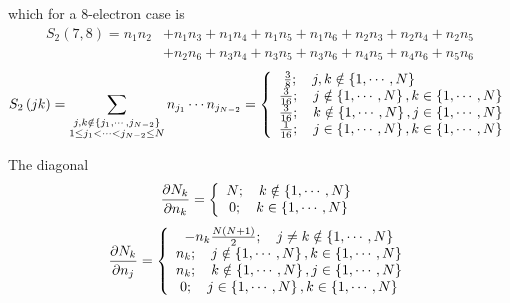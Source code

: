 \documentclass[aps,preprint]{revtex4}%
\begin{document}
which for a $8$-electron case is
\begin{align}
S_{2}\left(  7,8\right)  =n_{1}n_{2}  &  +n_{1}n_{3}+n_{1}n_{4}+n_{1}%
n_{5}+n_{1}n_{6}+n_{2}n_{3}+n_{2}n_{4}+n_{2}n_{5}\\
&  +n_{2}n_{6}+n_{3}n_{4}+n_{3}n_{5}+n_{3}n_{6}+n_{4}n_{5}+n_{4}n_{6}%
+n_{5}n_{6}%
\end{align}
\begin{equation}
S_{2}\left(  jk\right)  =\sum_{\substack{j,k\notin\left\{  j_{1}%
,\cdots,j_{N-2}\right\}  \\1\leq j_{1}<\cdots<j_{N-2}\leq N}}n_{j_{1}}\cdots
n_{j_{N-2}}=\left\{
\begin{array}
[c]{c}%
\frac{3}{8};\quad j,k\notin\left\{  1,\cdots,N\right\}  \qquad\qquad\qquad\\
\frac{3}{16};\quad j\notin\left\{  1,\cdots,N\right\}  ,k\in\left\{
1,\cdots,N\right\} \\
\frac{3}{16};\quad k\notin\left\{  1,\cdots,N\right\}  ,j\in\left\{
1,\cdots,N\right\} \\
\frac{1}{16};\quad j\in\left\{  1,\cdots,N\right\}  ,k\in\left\{
1,\cdots,N\right\}
\end{array}
\right.
\end{equation}


The diagonal
\begin{equation}
\frac{\partial N_{k}}{\partial n_{k}}=\left\{
\begin{array}
[c]{c}%
N;\quad k\notin\left\{  1,\cdots,N\right\} \\
0;\quad k\in\left\{  1,\cdots,N\right\}
\end{array}
\right.
\end{equation}%
\begin{equation}
\frac{\partial N_{k}}{\partial n_{j}}=\left\{
\begin{array}
[c]{c}%
-n_{k}\frac{N\left(  N+1\right)  }{2};\quad j\neq k\notin\left\{
1,\cdots,N\right\} \\
n_{k};\quad j\notin\left\{  1,\cdots,N\right\}  ,k\in\left\{  1,\cdots
,N\right\} \\
n_{k};\quad k\notin\left\{  1,\cdots,N\right\}  ,j\in\left\{  1,\cdots
,N\right\} \\
0;\quad j\in\left\{  1,\cdots,N\right\}  ,k\in\left\{  1,\cdots,N\right\}
\end{array}
\right.
\end{equation}
\end{document}
